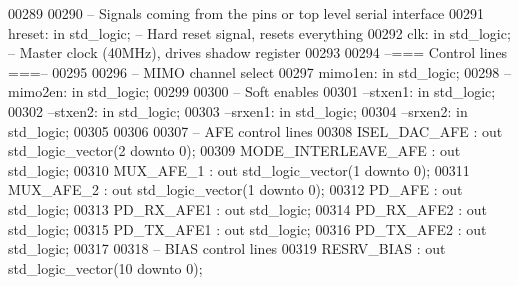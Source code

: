 \begin{DoxyCode}
00289     
00290 \textcolor{keyword}{        -- Signals coming from the pins or top level serial interface}
00291         hreset: \textcolor{keywordflow}{in} \textcolor{comment}{std\_logic};   \textcolor{keyword}{-- Hard reset signal, resets everything}
00292         clk: \textcolor{keywordflow}{in} \textcolor{comment}{std\_logic};  \textcolor{keyword}{-- Master clock (40MHz), drives shadow register}
00293         
00294 \textcolor{keyword}{        --=== Control lines ===--}
00295         
00296 \textcolor{keyword}{        -- MIMO channel select}
00297         mimo1en: \textcolor{keywordflow}{in} \textcolor{comment}{std\_logic};
00298 \textcolor{keyword}{        --mimo2en: in std\_logic;}
00299         
00300 \textcolor{keyword}{        -- Soft enables}
00301 \textcolor{keyword}{        --stxen1: in std\_logic;}
00302 \textcolor{keyword}{        --stxen2: in std\_logic;}
00303 \textcolor{keyword}{        --srxen1: in std\_logic;}
00304 \textcolor{keyword}{        --srxen2: in std\_logic;}
00305         
00306 
00307 \textcolor{keyword}{        -- AFE control lines}
00308         ISEL\_DAC\_AFE                : \textcolor{keywordflow}{out} \textcolor{comment}{std\_logic\_vector}(\textcolor{vhdllogic}{}\textcolor{vhdllogic}{2} \textcolor{keywordflow}{downto} \textcolor{vhdllogic}{}\textcolor{vhdllogic}{0});
00309         MODE\_INTERLEAVE\_AFE : \textcolor{keywordflow}{out} \textcolor{comment}{std\_logic};
00310         MUX\_AFE\_1                       : \textcolor{keywordflow}{out} \textcolor{comment}{std\_logic\_vector}(\textcolor{vhdllogic}{}\textcolor{vhdllogic}{1} \textcolor{keywordflow}{downto} \textcolor{vhdllogic}{}\textcolor{vhdllogic}{0});
00311         MUX\_AFE\_2                       : \textcolor{keywordflow}{out} \textcolor{comment}{std\_logic\_vector}(\textcolor{vhdllogic}{}\textcolor{vhdllogic}{1} \textcolor{keywordflow}{downto} \textcolor{vhdllogic}{}\textcolor{vhdllogic}{0});
00312         PD\_AFE                          : \textcolor{keywordflow}{out} \textcolor{comment}{std\_logic};
00313         PD\_RX\_AFE1                  : \textcolor{keywordflow}{out} \textcolor{comment}{std\_logic};
00314         PD\_RX\_AFE2                  : \textcolor{keywordflow}{out} \textcolor{comment}{std\_logic};
00315         PD\_TX\_AFE1                  : \textcolor{keywordflow}{out} \textcolor{comment}{std\_logic};
00316         PD\_TX\_AFE2                  : \textcolor{keywordflow}{out} \textcolor{comment}{std\_logic};
00317         
00318 \textcolor{keyword}{        -- BIAS control lines}
00319         RESRV\_BIAS          : \textcolor{keywordflow}{out} \textcolor{comment}{std\_logic\_vector}(\textcolor{vhdllogic}{}\textcolor{vhdllogic}{10} \textcolor{keywordflow}{downto} \textcolor{vhdllogic}{}\textcolor{vhdllogic}{0});

\end{DoxyCode}
